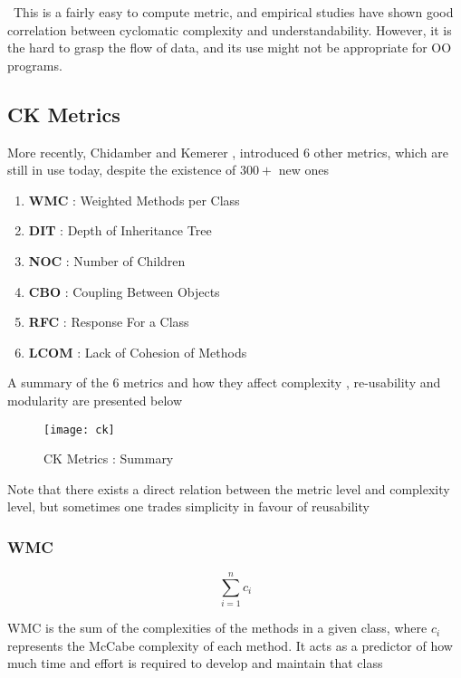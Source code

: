 \par{~This is a fairly easy to compute metric, and
empirical studies have shown good correlation between cyclomatic complexity and
understandability. However, it is the hard to grasp the flow of data, and its
use might not be appropriate for OO programs.}

\subsection{CK Metrics}

\par{More recently, Chidamber and Kemerer \cite{chidamber_kemerer94}, introduced
6 other metrics, which are still in use today, despite the existence of $300+$
new ones}

\begin{enumerate}
	\item\textbf{WMC} : Weighted Methods per Class
	\item\textbf{DIT} : Depth of Inheritance Tree
	\item\textbf{NOC} : Number of Children
	\item\textbf{CBO} : Coupling Between Objects
	\item\textbf{RFC} : Response For a Class
	\item\textbf{LCOM} : Lack of Cohesion of Methods
\end{enumerate}

\par{A summary of the 6 metrics and how they affect complexity , re-usability
and modularity are presented below}

\begin{figure}[H]
	\texttt{[image: ck]}
	\caption{CK Metrics : Summary}
\end{figure}

\par{Note that there exists a direct relation between the
metric level and complexity level, but sometimes one trades simplicity in favour
of reusability} 

\subsubsection{WMC}

$$\sum_{i=1}^{n}c_i$$

\par{WMC is the sum of the complexities of the methods in a given class, where
$c_i$ represents the McCabe complexity of each method. It acts as a predictor of
how much time and effort is required to develop and maintain that class}

